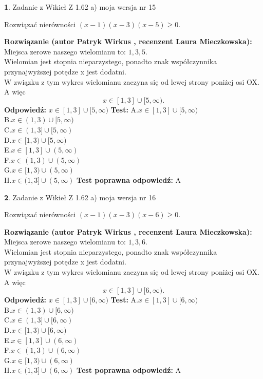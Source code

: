 \documentclass[12pt, a4paper]{article}
\theoremstyle{definition} %
\newtheorem{zad}{}
\newcommand{\zadStart}[1]{\begin{zad}#1\newline}
\newcommand{\zadStop}{\end{zad}}
\newcommand{\rozwStart}[2]{\noindent \textbf{Rozwiązanie (autor #1 , recenzent #2): }\newline}
\newcommand{\rozwStop}{\newline}
\newcommand{\odpStart}{\noindent \textbf{Odpowiedź:}\newline}
\newcommand{\odpStop}{\newline}
\newcommand{\testStart}{\noindent \textbf{Test:}\newline}
\newcommand{\testStop}{\newline}
\newcommand{\kluczStart}{\noindent \textbf{Test poprawna odpowiedź:}\newline}
\newcommand{\kluczStop}{\newline}
\begin{document}
\zadStart{Zadanie z Wikieł Z 1.62 a) moja wersja nr 15}

Rozwiązać nierówności $(x-1)(x-3)(x-5)\ge0$.
\zadStop
\rozwStart{Patryk Wirkus}{Laura Mieczkowska}
Miejsca zerowe naszego wielomianu to: $1, 3, 5$.\\
Wielomian jest stopnia nieparzystego, ponadto znak współczynnika przy\linebreak najwyższej potędze x jest dodatni.\\ W związku z tym wykres wielomianu zaczyna się od lewej strony poniżej osi OX. A więc $$x \in [1,3] \cup [5,\infty).$$
\rozwStop
\odpStart
$x \in [1,3] \cup [5,\infty)$
\odpStop
\testStart
A.$x \in [1,3] \cup [5,\infty)$\\
B.$x \in (1,3) \cup [5,\infty)$\\
C.$x \in (1,3] \cup [5,\infty)$\\
D.$x \in [1,3) \cup [5,\infty)$\\
E.$x \in [1,3] \cup (5,\infty)$\\
F.$x \in (1,3) \cup (5,\infty)$\\
G.$x \in [1,3) \cup (5,\infty)$\\
H.$x \in (1,3] \cup (5,\infty)$
\testStop
\kluczStart
A
\kluczStop



\zadStart{Zadanie z Wikieł Z 1.62 a) moja wersja nr 16}

Rozwiązać nierówności $(x-1)(x-3)(x-6)\ge0$.
\zadStop
\rozwStart{Patryk Wirkus}{Laura Mieczkowska}
Miejsca zerowe naszego wielomianu to: $1, 3, 6$.\\
Wielomian jest stopnia nieparzystego, ponadto znak współczynnika przy\linebreak najwyższej potędze x jest dodatni.\\ W związku z tym wykres wielomianu zaczyna się od lewej strony poniżej osi OX. A więc $$x \in [1,3] \cup [6,\infty).$$
\rozwStop
\odpStart
$x \in [1,3] \cup [6,\infty)$
\odpStop
\testStart
A.$x \in [1,3] \cup [6,\infty)$\\
B.$x \in (1,3) \cup [6,\infty)$\\
C.$x \in (1,3] \cup [6,\infty)$\\
D.$x \in [1,3) \cup [6,\infty)$\\
E.$x \in [1,3] \cup (6,\infty)$\\
F.$x \in (1,3) \cup (6,\infty)$\\
G.$x \in [1,3) \cup (6,\infty)$\\
H.$x \in (1,3] \cup (6,\infty)$
\testStop
\kluczStart
A
\kluczStop
\end{document}
